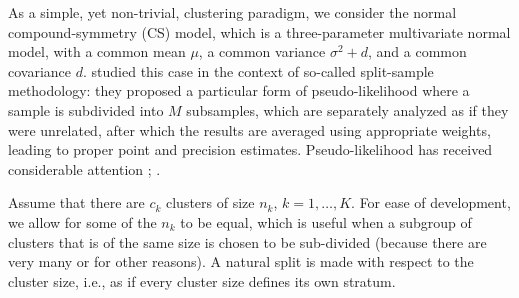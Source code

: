 \documentclass[11pt,a5paper,twoside]{book}
\begin{document}
As a simple, yet non-trivial, clustering paradigm, we consider the normal compound-symmetry (CS) model, which is a three-parameter multivariate normal model, with a common mean $\mu$, a common variance $\sigma^2+d$, and a common covariance $d$.  \cite{Iddi2011} studied this case in the context of so-called split-sample methodology: they proposed a particular form of pseudo-likelihood where a sample is subdivided into $M$ subsamples, which are separately analyzed as if they were unrelated, after which the results are averaged using appropriate weights, leading to proper point and precision estimates. 
Pseudo-likelihood has received considerable attention \citep[Ch.~9, 12, 21, 24, 25)]{molenberghs2005}; \citep[Ch.~6, 7]{aerts2002}.



Assume that there are $c_k$ clusters of size $n_k$, $k=1,\dots,K$. For ease of development, we allow for some of the $n_k$ to be equal, which is useful when a subgroup of clusters that is of the same size is chosen to be sub-divided (because there are very many or for other reasons). A natural split is made with respect to the cluster size, i.e., as if every cluster size defines its own stratum. 
\end{document}
